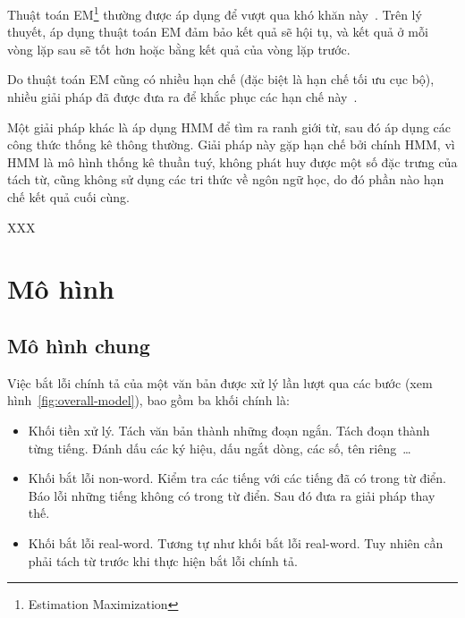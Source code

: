 \documentclass[a4paper,oneside,14pt]{extbook} %
\begin{document}
Thuật toán EM\footnote{Estimation Maximization} thường được áp dụng để vượt
qua khó khăn này~\cite{softcount,Sproat}. Trên lý thuyết, áp dụng
thuật toán EM đảm bảo kết quả sẽ hội tụ, và kết quả ở mỗi vòng lặp sau
sẽ tốt hơn hoặc bằng kết quả của vòng lặp trước. 

Do thuật toán EM cũng có nhiều hạn chế (đặc biệt là hạn chế tối ưu cục
bộ), nhiều giải pháp đã được đưa ra để khắc phục các hạn chế
này~\cite{text-tiling,self-supervised}. 

Một giải pháp khác là áp dụng HMM để tìm ra ranh giới từ, sau đó áp
dụng các công thức thống kê thông thường. Giải pháp này gặp hạn chế
bởi chính HMM, vì HMM là mô hình thống kê thuần tuý, không phát huy
được một số đặc trưng của tách từ, cũng không sử dụng các tri thức về
ngôn ngữ học, do đó phần nào hạn chế kết quả cuối cùng. 

XXX

\chapter{Mô hình}
\label{cha:model}
\minitoc

\section{Mô hình chung}

Việc bắt lỗi chính tả của một văn bản được xử lý lần lượt qua các bước
(xem hình~\ref{fig:overall-model}), bao gồm ba khối chính là:
\begin{itemize}
\item Khối tiền xử lý.
  Tách văn bản thành những đoạn ngắn. Tách
  đoạn thành từng tiếng. Đánh dấu các ký hiệu, dấu ngắt dòng, các số,
  tên riêng~\ldots{}

\item Khối bắt lỗi non-word.
   Kiểm tra các tiếng với các tiếng đã có
   trong từ điển. Báo lỗi những tiếng không có trong từ điển. Sau đó 
   đưa ra giải pháp thay thế.

\item Khối bắt lỗi real-word.
  Tương tự như khối bắt lỗi real-word. Tuy nhiên cần phải tách từ
  trước khi thực hiện bắt lỗi chính tả.
\end{itemize}

\end{document}
